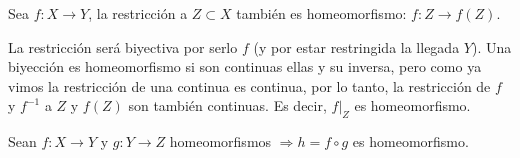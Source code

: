 \begin{prop}
Sea $f: X \rightarrow Y$, la restricción a $Z \subset X$ también es homeomorfismo: $f: Z \rightarrow f\left( Z \right)$.
\end{prop}
\begin{demo}
La restricción será biyectiva por serlo $f$ (y por estar restringida la llegada $Y$). Una biyección es homeomorfismo si son continuas ellas y su inversa, pero como ya vimos la restricción de una continua es continua, por lo tanto, la restricción de $f$ y $f^{-1}$ a $Z$ y $f\left( Z \right)$ son también continuas. Es decir, $f|_Z$ es homeomorfismo.
\end{demo}

\begin{prop}
Sean $f: X \rightarrow Y$ y $g: Y \rightarrow Z$ homeomorfismos $\Rightarrow h = f \circ g$ es homeomorfismo.
\end{prop}

